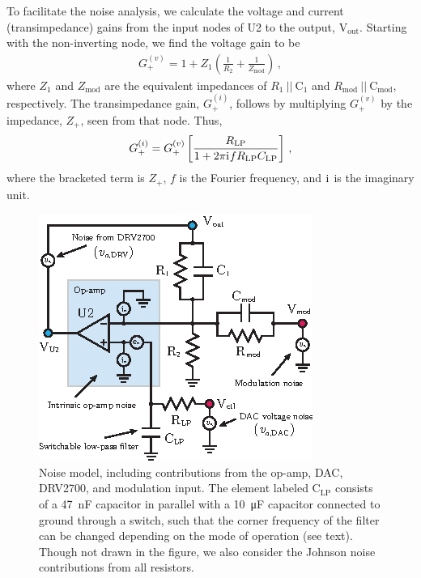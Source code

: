 \documentclass[aip,rsi,reprint]{revtex4-1} %
\newcommand{\iu}{\mathrm{i}\mkern1mu}
\begin{document}
To facilitate the noise analysis, we calculate the voltage and current (transimpedance) gains from the input nodes of U2 to the output, $\text{V}_\text{out}$.
Starting with the non-inverting node, we find the voltage gain to be
\begin{align}
G_{+}^{(v)} = 1 + Z_1\left(\frac{1}{R_2} + \frac{1}{Z_\text{mod}}\right)\,,
\end{align}
where $Z_1$ and $Z_\text{mod}$ are the equivalent impedances of $R_1~||~\text{C}_1$ and $R_\text{mod}~||~\text{C}_\text{mod}$, respectively.
The transimpedance gain, $G^{(i)}_{+}$, follows by multiplying $G_+^{(v)}$ by the impedance, $Z_+$, seen from that node. %
Thus,
\begin{align}
G_{+}^{(i)} = G_{+}^{(v)}\left[\frac{R_\text{LP}}{1+2\pi \iu f R_\text{LP} C_\text{LP}}\right]\,,
\end{align}
where the bracketed term is $Z_+$, $f$ is the Fourier frequency, and $\iu$ is the imaginary unit.

\begin{figure}[t]
\includegraphics[width=\columnwidth]{NoiseModel}
\caption{Noise model, including contributions from the op-amp, DAC, DRV2700, and modulation input. The element labeled $\text{C}_\text{LP}$ consists of a \SI{47}{\nano\farad} capacitor in parallel with a \SI{10}{\micro\farad} capacitor connected to ground through a switch, such that the corner frequency of the filter can be changed depending on the mode of operation  (see text). Though not drawn in the figure, we also consider the Johnson noise contributions from all resistors.
\label{Fig:NoiseModel}}
\end{figure}
\end{document}
